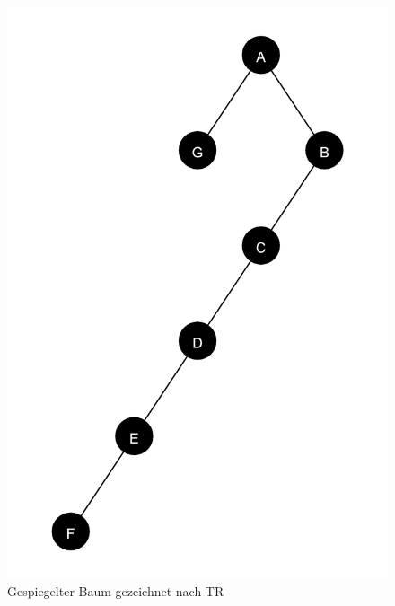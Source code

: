 \begin{figure}[ht]
\begin{minipage}[t]{0.45\linewidth}
        \includegraphics[scale = 0.075]{abbildungen/tree_spiegel_2_a3}
        \caption[]{Gespiegelter Baum gezeichnet nach TR}
    \end{minipage}
    \label{pic:TR_Spiegel} 
\end{figure}
